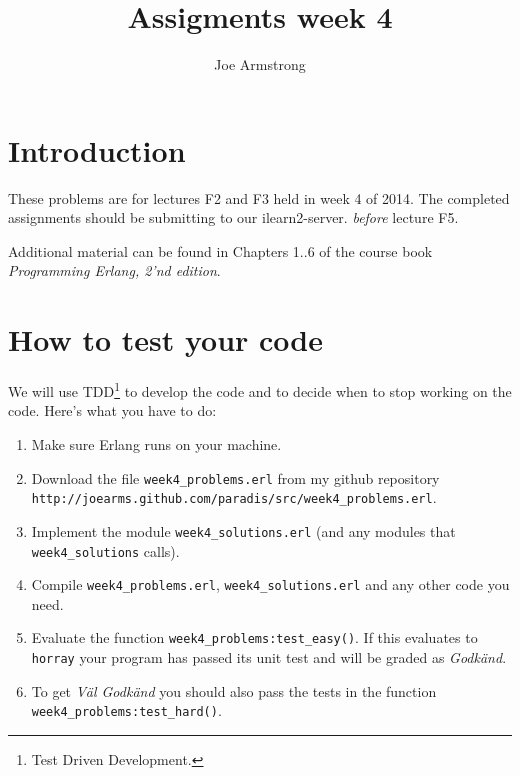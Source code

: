 \documentclass[12pt]{hitec}
\title{Assigments week 4}
\author{Joe Armstrong}
\begin{document}
\maketitle

\tableofcontents

\section{Introduction}

These problems are for lectures F2 and F3 held in week 4 of 2014.  The
completed assignments should be submitting to our ilearn2-server.
{\sl before} lecture F5.

Additional material can be found in Chapters 1..6 of
the course book {\sl Programming Erlang, 2'nd edition}. 

\section{How to test your code}

We will use TDD\footnote{Test Driven Development.} to develop the code
and to decide when to stop working on the code.
Here's what you have to do:

\begin{enumerate}
\item Make sure Erlang runs on your machine.

\item Download the file \verb+week4_problems.erl+ from my github repository
  \verb+http://joearms.github.com/paradis/src/week4_problems.erl+.

\item Implement the module \verb+week4_solutions.erl+ (and any modules
that \verb+week4_solutions+ calls).

\item Compile \verb+week4_problems.erl+, \verb+week4_solutions.erl+ and
any other code you need.

\item Evaluate the function \verb+week4_problems:test_easy()+. If this
  evaluates to \verb+horray+ your program has passed
  its unit test and will be graded as {\sl Godk\"{a}nd}.

\item To get {\sl V\"{a}l Godk\"{a}nd} you should also pass the tests
  in the function \verb+week4_problems:test_hard()+.

\end{enumerate}
\end{document}

